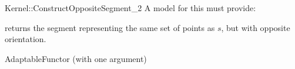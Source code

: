 \begin{ccRefFunctionObjectConcept}{Kernel::ConstructOppositeSegment_2}
A model for this must provide:


{returns the segment representing the same set of points as $s$,
but with opposite orientation.}

\ccRefines
AdaptableFunctor (with one argument)

\ccSeeAlso
{}\\

\end{ccRefFunctionObjectConcept}
